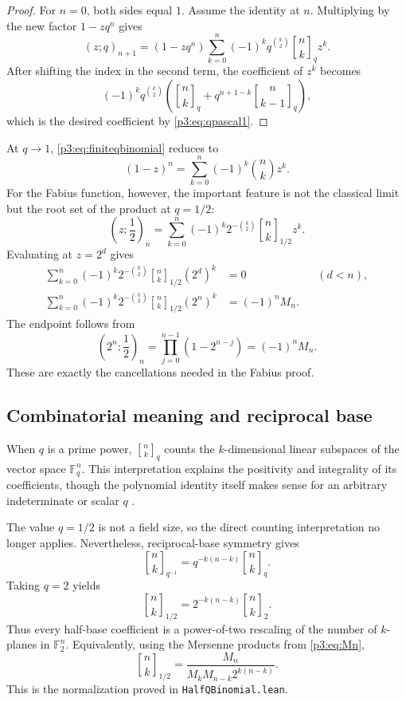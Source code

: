 \documentclass[11pt,oneside]{article}
\theoremstyle{definition}
\theoremstyle{remark}
\newcommand{\qpoch}[3]{\left(#1;#2\right)_{#3}}
\newcommand{\qbinom}[3]{{\genfrac{[}{]}{0pt}{}{#1}{#2}}_{#3}}
\newcommand{\halfqbinom}[2]{{\genfrac{[}{]}{0pt}{}{#1}{#2}}_{1/2}}
\begin{document}
\begin{proof}
For $n=0$, both sides equal $1$.  Assume the identity at $n$.  Multiplying by the new factor $1-zq^n$ gives
\[
 \qpoch{z}{q}{n+1}
 =(1-zq^n)\sum_{k=0}^{n}
 (-1)^kq^{\binom{k}{2}}\qbinom{n}{k}{q}z^k.
\]
After shifting the index in the second term, the coefficient of $z^k$ becomes
\[
 (-1)^kq^{\binom{k}{2}}
 \left(\qbinom{n}{k}{q}+q^{n+1-k}\qbinom{n}{k-1}{q}\right),
\]
which is the desired coefficient by \eqref{p3:eq:qpascal1}.
\end{proof}

At $q\to1$, \eqref{p3:eq:finiteqbinomial} reduces to
\[
 (1-z)^n=\sum_{k=0}^{n}(-1)^k\binom nkz^k.
\]
For the Fabius function, however, the important feature is not the classical limit but the root set of the product at $q=1/2$:
\begin{equation}\label{p3:eq:finitehalf}
 \qpoch{z}{\frac12}{n}
 =\sum_{k=0}^{n}(-1)^k2^{-\binom{k}{2}}
   \halfqbinom{n}{k}z^k.
\end{equation}
Evaluating at $z=2^d$ gives
\begin{align}
 \sum_{k=0}^{n}(-1)^k2^{-\binom{k}{2}}
   \halfqbinom{n}{k}(2^d)^k&=0 &&(d<n),
 \label{p3:eq:verticalzero}\\
 \sum_{k=0}^{n}(-1)^k2^{-\binom{k}{2}}
   \halfqbinom{n}{k}(2^n)^k
 &=(-1)^nM_n.
 \label{p3:eq:verticalendpoint}
\end{align}
The endpoint follows from
\[
 \qpoch{2^n}{\frac12}{n}
 =\prod_{j=0}^{n-1}(1-2^{n-j})
 =(-1)^nM_n.
\]
These are exactly the cancellations needed in the Fabius proof.

\subsection{Combinatorial meaning and reciprocal base}

When $q$ is a prime power, $\qbinom{n}{k}{q}$ counts the $k$-dimensional linear subspaces of the vector space $\mathbb F_q^n$.  This interpretation explains the positivity and integrality of its coefficients, though the polynomial identity itself makes sense for an arbitrary indeterminate or scalar $q$ \cite{p3:Andrews,p3:Stanley}.

The value $q=1/2$ is not a field size, so the direct counting interpretation no longer applies.  Nevertheless, reciprocal-base symmetry gives
\begin{equation}\label{p3:eq:reciprocalqbin}
 \qbinom{n}{k}{q^{-1}}
 =q^{-k(n-k)}\qbinom{n}{k}{q}.
\end{equation}
Taking $q=2$ yields
\begin{equation}\label{p3:eq:halfvs2}
 \boxed{
 \halfqbinom{n}{k}
 =2^{-k(n-k)}\qbinom{n}{k}{2}.}
\end{equation}
Thus every half-base coefficient is a power-of-two rescaling of the number of $k$-planes in $\mathbb F_2^n$.  Equivalently, using the Mersenne products from \eqref{p3:eq:Mn},
\begin{equation}\label{p3:eq:halfqMersenne}
 \boxed{
 \halfqbinom{n}{k}
 =\frac{M_n}{M_kM_{n-k}2^{k(n-k)}}.}
\end{equation}
This is the normalization proved in \texttt{HalfQBinomial.lean}.
\end{document}
